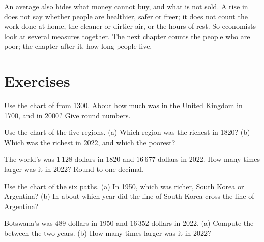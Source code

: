 An average also hides what money cannot buy, and what is not sold. A rise in
 does not say whether people are healthier, safer or freer;
it does not count the work done at home, the cleaner or dirtier air, or the
hours of rest. So economists look at several measures together. The next
chapter counts the people who are poor; the chapter after it, how long people
live.

\section{Exercises}

\begin{exercise}[$\star$]\label{exo:g6:living-standards:1}
Use the chart of  from 1300. About how much was  in the United Kingdom in 1700, and in 2000? Give round numbers.
\end{exercise}

\begin{exercise}[$\star$]\label{exo:g6:living-standards:2}
Use the chart of the five regions. (a) Which region was the richest in 1820?
(b) Which was the richest in 2022, and which the poorest?
\end{exercise}

\begin{exercise}[$\star$]\label{exo:g6:living-standards:3}
The world's  was $1\,128$ dollars in 1820 and $16\,677$ dollars
in 2022. How many times larger was it in 2022? Round to one decimal.
\end{exercise}

\begin{exercise}[$\star$]\label{exo:g6:living-standards:4}
Use the chart of the six paths. (a) In 1950, which was richer, South Korea or
Argentina? (b) In about which year did the line of South Korea cross the line
of Argentina?
\end{exercise}

\begin{exercise}[$\star\star$]\label{exo:g6:living-standards:5}
Botswana's  was $489$ dollars in 1950 and $16\,352$ dollars in
2022. (a) Compute the  between the two years. (b) How many times
larger was it in 2022?
\end{exercise}

